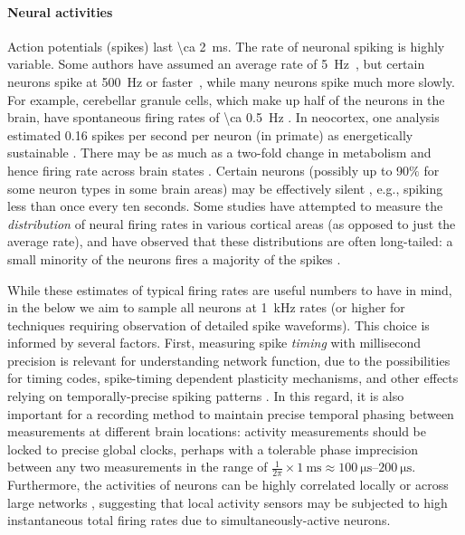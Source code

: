 \paragraph{Neural activities}
Action potentials (spikes) last \SI{\ca 2}{\milli\second}.
The rate of neuronal spiking is highly variable. Some authors have assumed an average rate of \SI{5}{\hertz}~\cite{sarpeshkar10, harris2012synaptic}, but certain neurons spike at \SI{500}{\hertz} or faster~\cite{gittis10}, while many neurons spike much more slowly. For example, cerebellar granule cells, which make up half of the neurons in the brain, have spontaneous firing rates of \SI{\ca 0.5}{\hertz} \cite{chadderton2004integration}. In neocortex, one analysis estimated 0.16 spikes per second per neuron (in primate) as energetically sustainable \cite{lennie2003cost}. There may be as much as a two-fold change in metabolism and hence firing rate across brain states \cite{howarth2012updated}. Certain neurons (possibly up to 90$\%$ for some neuron types in some brain areas) may be effectively silent \cite{Shoham2006, Barth2012345}, e.g., spiking less than once every ten seconds. Some studies have attempted to measure the \emph{distribution} of neural firing rates in various cortical areas (as opposed to just the average rate), and have observed that these distributions are often long-tailed: a small minority of the neurons fires a majority of the spikes \cite{roxin2011distribution, oconnor2010neural, hromadka2008sparse, shafi2007variability}. 

While these estimates of  typical firing rates are useful numbers to have in mind, in the below we aim to sample all neurons at \SI{1}{\kilo\hertz} rates (or higher for techniques requiring observation of detailed spike waveforms). This choice is informed by several factors. First, measuring spike \emph{timing} with millisecond precision is relevant for understanding network function, due to the possibilities for timing codes, spike-timing dependent plasticity mechanisms, and other effects relying on temporally-precise spiking patterns \cite{markram2011history, Babadi2013, Taillefumier27032013, Gire2013416}. In this regard, it is also important for a recording method to maintain precise temporal phasing between measurements at different brain locations: activity measurements should be locked to precise global clocks, perhaps with a tolerable phase imprecision between any two measurements in the range of $\frac{1}{2\pi} \times \SI{1}{\milli\second} \approx \SIrange{100}{200}{\micro\second}$. Furthermore, the activities of neurons can be highly correlated locally or across large networks \cite{schneidman2006weak}, suggesting that local activity sensors may be subjected to high instantaneous total firing rates due to simultaneously-active neurons.

